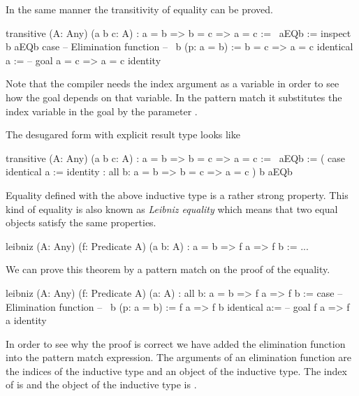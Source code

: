 In the same manner the transitivity of equality can be proved.
\begin{alba}
    transitive
        (A: Any) (a b c: A)
        : a = b => b = c => a = c
    :=
        \ aEQb :=
            inspect
                b aEQb
            case
                -- Elimination function
                -- \ b (p: a = b) := b = c => a = c
                identical a :=
                        -- goal a = c => a = c
                    identity
\end{alba}
%
Note that the compiler needs the index argument as a variable in order to see
how the goal depends on that variable. In the pattern match it substitutes the
index variable  in the goal by the parameter .

\noindent The desugared form with explicit result type looks like
\begin{alba}
    transitive
        (A: Any) (a b c: A)
        : a = b => b = c => a = c
    :=
        \ aEQb :=
            (
                case
                    identical a := identity
                : all b: a = b => b = c => a = c
            )
                b
                aEQb
\end{alba}



Equality defined with the above inductive type is a rather strong
property. This kind of equality is also known as \emph{Leibniz equality} which
means that two equal objects satisfy the same properties.
%
\begin{alba}
    leibniz
        (A: Any)
        (f: Predicate A)
        (a b: A)
        : a = b => f a => f b
    :=
        ...
\end{alba}


We can prove this theorem by a pattern match on the proof of the equality.

\begin{alba}
    leibniz
        (A: Any)
        (f: Predicate A)
        (a: A)
        : all b: a = b => f a => f b
    :=
        case
            -- Elimination function
            -- \ b (p: a = b) := f a => f b
            identical a:=
                -- goal f a => f a
                identity
\end{alba}


In order to see why the proof is correct we have added the elimination function
into the pattern match expression. The arguments of an elimination function are
the indices of the inductive type and an object of the inductive type. The index
of  is  and the object of the inductive type is .

